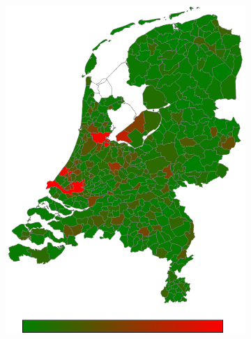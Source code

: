 \documentclass[a4paper,twoside,11pt]{article}
\begin{document}
\begin{figure}[h]
\begin{subfigure}[b]{0.12\textwidth}
                \includegraphics[width=\textwidth]{Heatmaps/HeatMap7.png}
                \caption{}
                \label{fig:notEurope}
        \end{subfigure}
        \begin{subfigure}[b]{0.12\textwidth}

\end{subfigure}
\end{figure}
\end{document}
